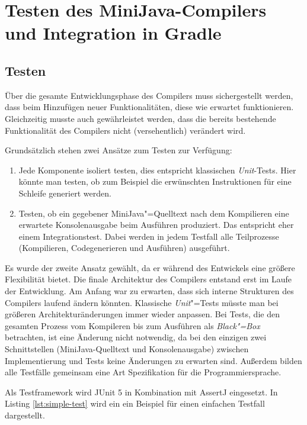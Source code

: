 \chapter{Testen des MiniJava-Compilers und Integration in Gradle}
\label{cha:Testen-des-Compilers}

\section{Testen}

Über die gesamte Entwicklungsphase des Compilers muss sichergestellt werden, dass beim Hinzufügen neuer Funktionalitäten, diese wie erwartet funktionieren. Gleichzeitig musste auch gewährleistet werden, dass die bereits bestehende Funktionalität des Compilers nicht (versehentlich) verändert wird.

Grundsätzlich stehen zwei Ansätze zum Testen zur Verfügung:
\begin{enumerate}
    \item Jede Komponente isoliert testen, dies entspricht klassischen \emph{Unit}-Tests. Hier könnte man testen, ob zum Beispiel die erwünschten Instruktionen für eine Schleife generiert werden. 
    \item Testen, ob ein gegebener MiniJava"=Quelltext nach dem Kompilieren eine erwartete Konsolenausgabe beim Ausführen produziert. Das entspricht eher einem Integrationstest. Dabei werden in jedem Testfall alle Teilprozesse (Kompilieren, Codegenerieren und Ausführen) ausgeführt.
\end{enumerate}

Es wurde der zweite Ansatz gewählt, da er während des Entwickels eine größere Flexibilität bietet. Die finale Architektur des Compilers entstand erst im Laufe der Entwicklung. Am Anfang war zu erwarten, dass sich interne Strukturen des Compilers laufend ändern könnten. Klassische \emph{Unit}"=Tests müsste man bei größeren Architekturänderungen immer wieder anpassen. Bei Tests, die den gesamten Prozess vom Kompileren bis zum Ausführen als \emph{Black"=Box} betrachten, ist eine Änderung nicht notwendig, da bei den einzigen zwei Schnittstellen (MiniJava-Quelltext und Konsolenausgabe) zwischen Implementierung und Tests keine Änderungen zu erwarten sind. Außerdem bilden alle Testfälle gemeinsam eine Art Spezifikation für die Programmiersprache.

Als Testframework wird JUnit 5 \cite{JUnit} in Kombination mit AssertJ \cite{AssertJ} eingesetzt. In Listing \ref{lst:simple-test} wird ein ein Beispiel für einen einfachen Testfall dargestellt.

